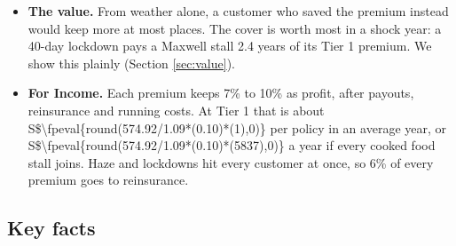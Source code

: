 \documentclass[11pt,a4paper]{article}
\newcommand{\sgd}{\textup{S\$}}
\def\bizPremium{574.92}
\newcommand{\biz}[2]{\sgd\num[group-separator={,},group-minimum-digits=4]{\fpeval{round(\bizPremium/1.09*(#1)*(#2),0)}}}
\begin{document}
\begin{tcolorbox}[colback=soft,colframe=accent,boxrule=0.6pt,arc=2pt,left=8pt,right=8pt,top=6pt,bottom=6pt]
\begin{itemize}[leftmargin=1.2em,itemsep=0.25em,topsep=0.25em]
  \item \textbf{The value.} From weather alone, a customer who saved the premium instead would keep more at most places. The cover is worth most in a shock year: a 40-day lockdown pays a Maxwell stall 2.4 years of its Tier 1 premium. We show this plainly (Section \ref{sec:value}).
  \item \textbf{For Income.} Each premium keeps 7\% to 10\% as profit, after payouts, reinsurance and running costs. At Tier 1 that is about \biz{0.10}{1} per policy in an average year, or \biz{0.10}{5837} a year if every cooked food stall joins. Haze and lockdowns hit every customer at once, so 6\% of every premium goes to reinsurance.
\end{itemize}
\end{tcolorbox}

\subsection*{Key facts}
\end{document}
